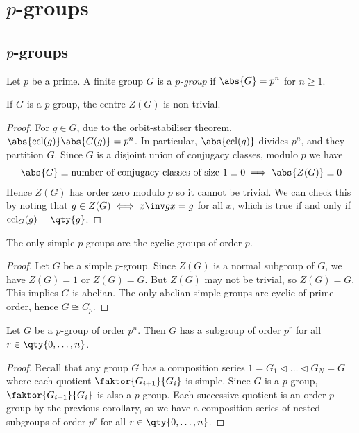 \section{$p$-groups}

\subsection{$p$-groups}
\begin{definition}
	Let $p$ be a prime.
	A finite group $G$ is a \textit{$p$-group} if $\abs{G} = p^n$ for $n \geq 1$.
\end{definition}
\begin{theorem}
	If $G$ is a $p$-group, the centre $Z(G)$ is non-trivial.
\end{theorem}
\begin{proof}
	For $g \in G$, due to the orbit-stabiliser theorem, $\abs{\ccl(g)} \abs{C(g)} = p^n$.
	In particular, $\abs{\ccl(g)}$ divides $p^n$, and they partition $G$.
	Since $G$ is a disjoint union of conjugacy classes, modulo $p$ we have
	\begin{align*}
		\abs{G} \equiv \text{number of conjugacy classes of size } 1 \equiv 0 \implies \abs{Z(G)} \equiv 0
	\end{align*}
	Hence $Z(G)$ has order zero modulo $p$ so it cannot be trivial.
	We can check this by noting that $g \in Z(G) \iff x\inv g x = g$ for all $x$, which is true if and only if $\ccl_G(g) = \qty{g}$.
\end{proof}
\begin{corollary}
	The only simple $p$-groups are the cyclic groups of order $p$.
\end{corollary}
\begin{proof}
	Let $G$ be a simple $p$-group.
	Since $Z(G)$ is a normal subgroup of $G$, we have $Z(G) = 1$ or $Z(G) = G$.
	But $Z(G)$ may not be trivial, so $Z(G) = G$.
	This implies $G$ is abelian.
	The only abelian simple groups are cyclic of prime order, hence $G \cong C_p$.
\end{proof}
\begin{corollary}
	Let $G$ be a $p$-group of order $p^n$.
	Then $G$ has a subgroup of order $p^r$ for all $r \in \qty{0, \dots, n}$.
\end{corollary}
\begin{proof}
	Recall that any group $G$ has a composition series $1 = G_1 \triangleleft \dots \triangleleft G_N = G$ where each quotient $\faktor{G_{i+1}}{G_i}$ is simple.
	Since $G$ is a $p$-group, $\faktor{G_{i+1}}{G_i}$ is also a $p$-group.
	Each successive quotient is an order $p$ group by the previous corollary, so we have a composition series of nested subgroups of order $p^r$ for all $r \in \qty{0, \dots, n}$.
\end{proof}
